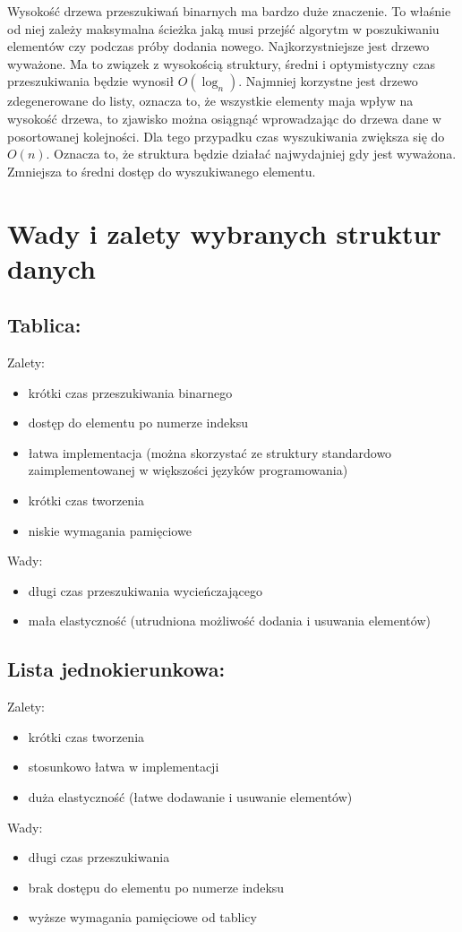 \documentclass[polish,polish,a4paper]{article}
\begin{document}
Wysokość drzewa przeszukiwań binarnych ma bardzo duże znaczenie. To właśnie od niej zależy maksymalna ścieżka jaką musi przejść algorytm w poszukiwaniu elementów czy  podczas próby dodania nowego. 
Najkorzystniejsze jest drzewo wyważone. Ma to związek z wysokością struktury, średni i optymistyczny czas przeszukiwania będzie wynosił $O(\log_{n})$. Najmniej korzystne jest drzewo zdegenerowane do listy, oznacza to, że wszystkie elementy maja wpływ na wysokość drzewa, to zjawisko można osiągnąć wprowadzając do drzewa dane w posortowanej kolejności. Dla tego przypadku czas wyszukiwania zwiększa się do $ O(n) $. Oznacza to, że struktura będzie działać najwydajniej gdy jest wyważona. Zmniejsza to średni dostęp do wyszukiwanego elementu.

\section{Wady i zalety wybranych struktur danych}
\subsection{Tablica:}
Zalety:
\begin{itemize}
	\item krótki czas przeszukiwania binarnego
	\item dostęp do elementu po numerze indeksu
	\item łatwa implementacja (można skorzystać ze struktury standardowo zaimplementowanej w większości języków programowania)
	\item krótki czas tworzenia
	\item niskie wymagania pamięciowe
\end{itemize}
Wady:
\begin{itemize}
	\item długi czas przeszukiwania wycieńczającego
	\item mała elastyczność (utrudniona możliwość dodania i usuwania elementów)
\end{itemize}


\subsection{Lista jednokierunkowa:}
Zalety:
\begin{itemize}
	\item krótki czas tworzenia
	\item stosunkowo łatwa w implementacji 
	\item duża elastyczność (łatwe dodawanie i usuwanie elementów)
\end{itemize}
Wady:
\begin{itemize}
	\item długi czas przeszukiwania
	\item brak dostępu do elementu po numerze indeksu
	\item wyższe wymagania pamięciowe od tablicy
\end{itemize}
\end{document}
